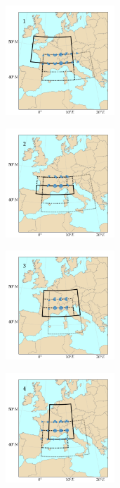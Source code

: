 \documentclass[twocol]{ametsoc}
\begin{document}
\begin{figure}[htb]
	\centering
	\begin{subfigure}{.5\columnwidth}
		\centering
		\includegraphics[width=4.1cm]{figures/spatial_win_z4-hi4/Spatial_windows_1.png}
	\end{subfigure}%
	\begin{subfigure}{.5\columnwidth}
		\centering
		\includegraphics[width=4.1cm]{figures/spatial_win_z4-hi4/Spatial_windows_2.png}
	\end{subfigure}
	\begin{subfigure}{.5\columnwidth}
		\centering
		\includegraphics[width=4.1cm]{figures/spatial_win_z4-hi4/Spatial_windows_3.png}
	\end{subfigure}%
	\begin{subfigure}{.5\columnwidth}
		\centering
		\includegraphics[width=4.1cm]{figures/spatial_win_z4-hi4/Spatial_windows_4.png}

\end{subfigure}
\end{figure}
\end{document}
